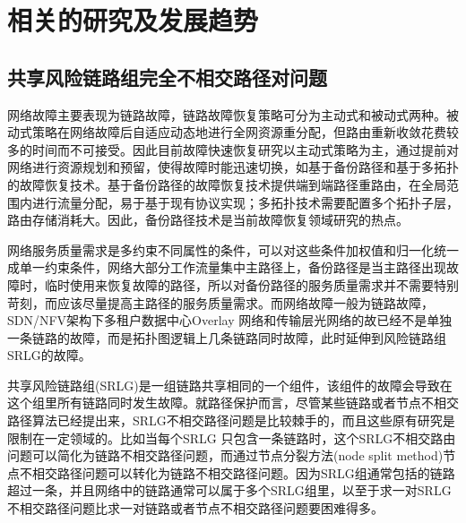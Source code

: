 \section{相关的研究及发展趋势}
\subsection{共享风险链路组完全不相交路径对问题}
网络故障主要表现为链路故障，链路故障恢复策略可分为主动式和被动式两种\cite{kvalbein2006fast,qi2012research}。被动式策略在网络故障后自适应动态地进行全网资源重分配，但路由重新收敛花费较多的时间而不可接受。因此目前故障快速恢复研究以主动式策略为主，通过提前对网络进行资源规划和预留，使得故障时能迅速切换，如基于备份路径和基于多拓扑\cite{shand2010ip}的故障恢复技术。基于备份路径的故障恢复技术提供端到端路径重路由，在全局范围内进行流量分配，易于基于现有协议实现；多拓扑技术需要配置多个拓扑子层，路由存储消耗大。因此，备份路径技术是当前故障恢复领域研究的热点。

网络服务质量需求是多约束不同属性的条件，可以对这些条件加权值和归一化统一成单一约束条件，网络大部分工作流量集中主路径上，备份路径是当主路径出现故障时，临时使用来恢复故障的路径，所以对备份路径的服务质量需求并不需要特别苛刻，而应该尽量提高主路径的服务质量需求。而网络故障一般为链路故障，SDN/NFV架构下多租户数据中心Overlay 网络和传输层光网络的故已经不是单独一条链路的故障，而是拓扑图逻辑上几条链路同时故障，此时延伸到风险链路组SRLG的故障。

共享风险链路组(SRLG)是一组链路共享相同的一个组件，该组件的故障会导致在这个组里所有链路同时发生故障。就路径保护而言，尽管某些链路或者节点不相交路径算法已经提出来，SRLG不相交路径问题是比较棘手的，而且这些原有研究是限制在一定领域的。比如当每个SRLG 只包含一条链路时，这个SRLG不相交路由问题可以简化为链路不相交路径问题，而通过节点分裂方法(node split method)\cite{ford2015flows}节点不相交路径问题可以转化为链路不相交路径问题。因为SRLG组通常包括的链路超过一条，并且网络中的链路通常可以属于多个SRLG组里，以至于求一对SRLG 不相交路径问题比求一对链路或者节点不相交路径问题要困难得多。


